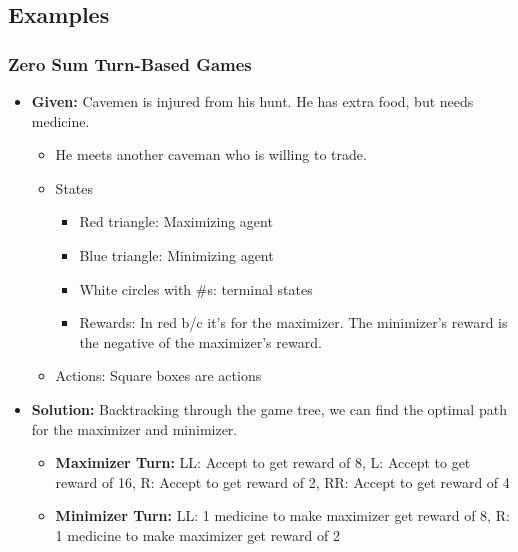 \subsection{Examples}
\subsubsection{Zero Sum Turn-Based Games}
\begin{example}
    \begin{itemize}
        \item \textbf{Given:} Cavemen is injured from his hunt. He has extra food, but needs medicine.
        \begin{itemize}
            \item He meets another caveman who is willing to trade. 
        \end{itemize} 
        \vspace{-1.5em}
        \vspace{-1.5em}
        \begin{itemize}
            \item States
            \begin{itemize}
                \item Red triangle: Maximizing agent
                \item Blue triangle: Minimizing agent
                \item White circles with \#s: terminal states
                \item Rewards: In red b/c it's for the maximizer. The minimizer's reward is the negative of the maximizer's reward.
            \end{itemize}
            \item Actions: Square boxes are actions
        \end{itemize}
        \item \textbf{Solution:} Backtracking through the game tree, we can find the optimal path for the maximizer and minimizer.
        \begin{itemize}
            \item \textbf{Maximizer Turn:} LL: Accept to get reward of 8, L: Accept to get reward of 16, R: Accept to get reward of 2, RR: Accept to get reward of 4
            \item \textbf{Minimizer Turn:} LL: 1 medicine to make maximizer get reward of 8, R: 1 medicine to make maximizer get reward of 2

\end{itemize}
\end{itemize}
\end{example}
